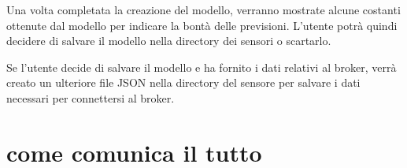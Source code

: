 \documentclass[a4paper,10pt]{article}
\begin{document}
Una volta completata la creazione del modello, verranno mostrate alcune costanti ottenute dal modello per indicare la bontà delle previsioni. L'utente potrà quindi decidere di salvare il modello nella directory dei sensori o scartarlo.

Se l'utente decide di salvare il modello e ha fornito i dati relativi al broker, verrà creato un ulteriore file JSON nella directory del sensore per salvare i dati necessari per connettersi al broker.

\section{come comunica il tutto}
\end{document}
